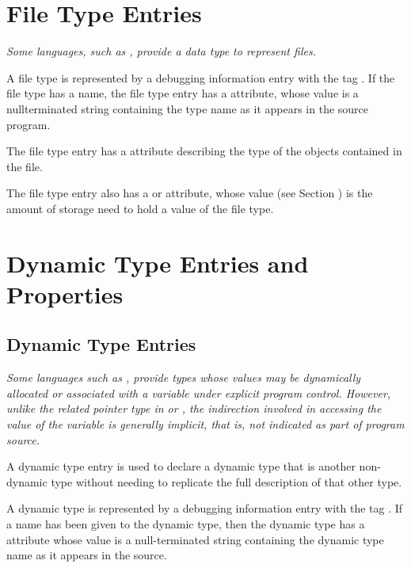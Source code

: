 \section{File Type Entries}
\label{chap:filetypeentries}

\textit{Some languages, such as , 
provide a data type to represent 
files.}

A file type is represented by a debugging information entry
with 
the tag
\DWTAGfiletypeTARG. 
If the file type has a name,
the file type entry has a \DWATname{} attribute,
whose value
is a null\dash terminated string containing the type name as it
appears in the source program.

The file type entry has 
a \DWATtype{} attribute describing
the type of the objects contained in the file.

The file type entry also 
has 
a 
\DWATbytesize{} or
\DWATbitsize{} attribute, whose value 
(see Section )
is the amount of storage need to hold a value of the file type.

\section{Dynamic Type Entries and Properties}

\subsection{Dynamic Type Entries}
\textit{Some languages such as 
, provide types whose values
may be dynamically allocated or associated with a variable
under explicit program control. However, unlike the related
pointer type in  or 
, the indirection involved in accessing
the value of the variable is generally implicit, that is, not
indicated as part of program source.}

A dynamic type entry is used to declare a dynamic type that is 
 another non-dynamic type without needing to
replicate the full description of that other type.

A dynamic type is represented by a debugging information entry
with the tag \DWTAGdynamictypeTARG. If a name has been given to the
dynamic type, then the dynamic type has a \DWATname{} attribute 
whose value is a null-terminated string containing the dynamic
type name as it appears in the source.
	
